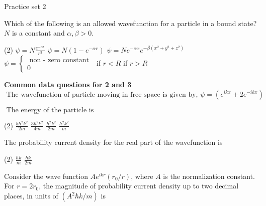 \newpage
\begin{abox}
	Practice set 2
	\end{abox}
\begin{enumerate}
	\begin{minipage}{\textwidth}
	\item Which of the following is an allowed wavefunction for a particle in a bound state? $N$ is a constant and $\alpha, \beta>0$.
\end{minipage}
\begin{tasks}(2)
	\task[\textbf{A.}] $\psi=N \frac{e^{-\alpha r}}{r^{3}}$
	\task[\textbf{B.}]$\psi=N\left(1-e^{-\alpha r}\right)$
	\task[\textbf{C.}]$\psi=N e^{-\alpha x} e^{-\beta\left(x^{2}+y^{2}+z^{2}\right)}$
	\task[\textbf{D.}]$\psi=\left\{\begin{array}{l}\text { non - zero constant } \\ 0\end{array}\right.$
	if $r<R$ if $r>R$
\end{tasks}
\textbf{Common data questions for 2 and 3}\\
$\text { The wavefunction of particle moving in free space is given by, } \psi=\left(e^{i k x}+2 e^{-i k x}\right)$\\
\begin{minipage}{\textwidth}
	\item $\text { The energy of the particle is }$
\end{minipage}
\begin{tasks}(2)
	\task[\textbf{A.}] $\frac{5 \hbar^{2} k^{2}}{2 m}$
	\task[\textbf{B.}]$\frac{3 \hbar^{2} k^{2}}{4 m}$
	\task[\textbf{C.}]$\frac{\hbar^{2} k^{2}}{2 m}$
	\task[\textbf{D.}]$\frac{\hbar^{2} k^{2}}{m}$
\end{tasks}
	\begin{minipage}{\textwidth}
	\item The probability current density for the real part of the wavefunction is
\end{minipage}
\begin{tasks}(2)
	\task[\textbf{B.}]$\frac{\hbar k}{m}$
	\task[\textbf{C.}]$\frac{\hbar k}{2 m}$
\end{tasks}
	\begin{minipage}{\textwidth}
	\item Consider the wave function $A e^{i k r}\left(r_{0} / r\right)$, where $A$ is the normalization constant.
	For $r=2 r_{0}$, the magnitude of probability current density up to two decimal places, in units of $\left(A^{2} \hbar k / m\right)$ is

\end{minipage}
\end{enumerate}
